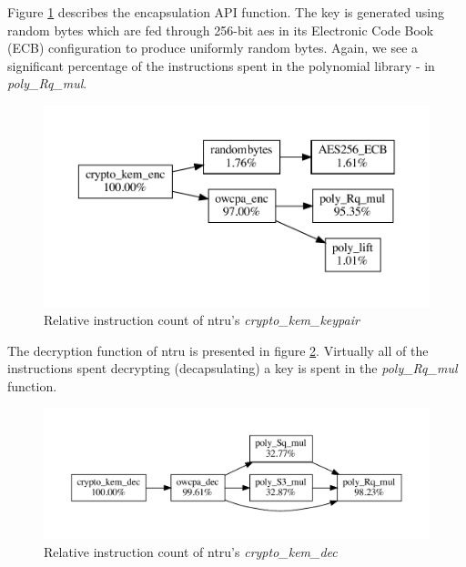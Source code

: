 Figure \ref{figure:result:hot-paths:ntru:crypto_kem_enc} describes the encapsulation API function. The key is generated using random bytes which are fed through 256-bit \gls{aes} in its Electronic Code Book (ECB) configuration to produce uniformly random bytes. Again, we see a significant percentage of the instructions spent in the polynomial library - in \textit{poly\_Rq\_mul}.

\begin{figure}[H]
    \centering
    \includegraphics[scale=0.5]{chapters/results/hot-paths/ntru/crypto_kem_enc.pdf}
    \caption{Relative instruction count of \gls{ntru}'s \textit{crypto\_kem\_keypair}}
    \label{figure:result:hot-paths:ntru:crypto_kem_enc}
\end{figure}

The decryption function of \gls{ntru} is presented in figure \ref{figure:result:hot-paths:ntru:crypto_kem_dec}. Virtually all of the instructions spent decrypting (decapsulating) a key is spent in the \textit{poly\_Rq\_mul} function.

\begin{figure}[H]
    \centering
    \includegraphics[scale=0.5]{chapters/results/hot-paths/ntru/crypto_kem_dec.pdf}
    \caption{Relative instruction count of \gls{ntru}'s \textit{crypto\_kem\_dec}}
    \label{figure:result:hot-paths:ntru:crypto_kem_dec}
\end{figure}

